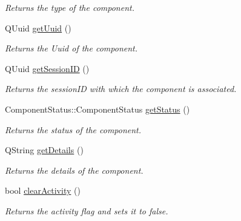 \begin{DoxyCompactItemize}
\begin{DoxyCompactList}\small\item\em Returns the type of the component. \end{DoxyCompactList}\item 
\hypertarget{class_component_info_abd504db0d8da9c8cdf4b4bc278abfe2e}{Q\-Uuid \hyperlink{class_component_info_abd504db0d8da9c8cdf4b4bc278abfe2e}{get\-Uuid} ()}\label{class_component_info_abd504db0d8da9c8cdf4b4bc278abfe2e}

\begin{DoxyCompactList}\small\item\em Returns the Uuid of the component. \end{DoxyCompactList}\item 
\hypertarget{class_component_info_a31286febbfa891f3bdecfa03816fe317}{Q\-Uuid \hyperlink{class_component_info_a31286febbfa891f3bdecfa03816fe317}{get\-Session\-I\-D} ()}\label{class_component_info_a31286febbfa891f3bdecfa03816fe317}

\begin{DoxyCompactList}\small\item\em Returns the session\-I\-D with which the component is associated. \end{DoxyCompactList}\item 
\hypertarget{class_component_info_a85ac344ba469aa547e4ae3a7a00f1518}{Component\-Status\-::\-Component\-Status \hyperlink{class_component_info_a85ac344ba469aa547e4ae3a7a00f1518}{get\-Status} ()}\label{class_component_info_a85ac344ba469aa547e4ae3a7a00f1518}

\begin{DoxyCompactList}\small\item\em Returns the status of the component. \end{DoxyCompactList}\item 
\hypertarget{class_component_info_ad2c46e501b5323add755ba9faebe049c}{Q\-String \hyperlink{class_component_info_ad2c46e501b5323add755ba9faebe049c}{get\-Details} ()}\label{class_component_info_ad2c46e501b5323add755ba9faebe049c}

\begin{DoxyCompactList}\small\item\em Returns the details of the component. \end{DoxyCompactList}\item 
bool \hyperlink{class_component_info_a8a3d218b25b484dd9611f309dda06679}{clear\-Activity} ()
\begin{DoxyCompactList}\small\item\em Returns the activity flag and sets it to false. \end{DoxyCompactList}\end{DoxyCompactItemize}


